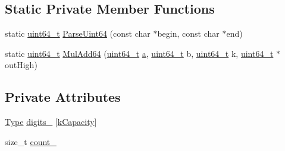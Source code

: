 \subsection*{Static Private Member Functions}
\begin{DoxyCompactItemize}
\item 
static \mbox{\hyperlink{stdint_8h_aec6fcb673ff035718c238c8c9d544c47}{uint64\+\_\+t}} \mbox{\hyperlink{classrapidjson_1_1internal_1_1_big_integer_ad51eecf2efb0a806db48913f9dcb13a6}{Parse\+Uint64}} (const char $\ast$begin, const char $\ast$end)
\item 
static \mbox{\hyperlink{stdint_8h_aec6fcb673ff035718c238c8c9d544c47}{uint64\+\_\+t}} \mbox{\hyperlink{classrapidjson_1_1internal_1_1_big_integer_a58f2555329537d758530430c5baf1e49}{Mul\+Add64}} (\mbox{\hyperlink{stdint_8h_aec6fcb673ff035718c238c8c9d544c47}{uint64\+\_\+t}} \mbox{\hyperlink{namespacerapidjson_a11fce64e721729aaf6be4a485c78f231}{a}}, \mbox{\hyperlink{stdint_8h_aec6fcb673ff035718c238c8c9d544c47}{uint64\+\_\+t}} b, \mbox{\hyperlink{stdint_8h_aec6fcb673ff035718c238c8c9d544c47}{uint64\+\_\+t}} k, \mbox{\hyperlink{stdint_8h_aec6fcb673ff035718c238c8c9d544c47}{uint64\+\_\+t}} $\ast$out\+High)
\end{DoxyCompactItemize}
\subsection*{Private Attributes}
\begin{DoxyCompactItemize}
\item 
\mbox{\hyperlink{classrapidjson_1_1internal_1_1_big_integer_a37d8e8c111f0d76fa07bb4da4790514d}{Type}} \mbox{\hyperlink{classrapidjson_1_1internal_1_1_big_integer_a42354d197985345d984dd0ab5de739d4}{digits\+\_\+}} \mbox{[}\mbox{\hyperlink{classrapidjson_1_1internal_1_1_big_integer_aad4550b1fb2215bbbdc92f1773bc988c}{k\+Capacity}}\mbox{]}
\item 
size\+\_\+t \mbox{\hyperlink{classrapidjson_1_1internal_1_1_big_integer_a510e118f1ffc7fad2c6b8632b58c4cd4}{count\+\_\+}}
\end{DoxyCompactItemize}
